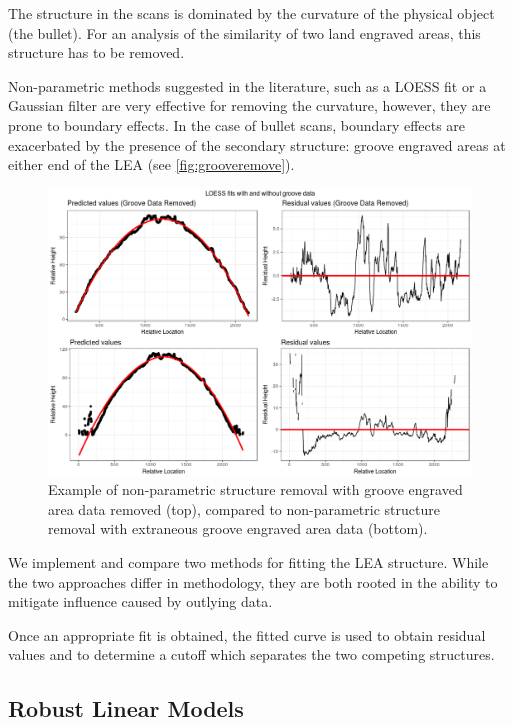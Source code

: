 \documentclass[]{article}
\begin{document}
The structure in the scans is dominated by the curvature of the physical
object (the bullet). For an analysis of the similarity of two land
engraved areas, this structure has to be removed.

Non-parametric methods suggested in the literature, such as a LOESS fit
\citep{Hare1} or a Gaussian filter \citep{Chu1} are very effective for
removing the curvature, however, they are prone to boundary effects. In
the case of bullet scans, boundary effects are exacerbated by the
presence of the secondary structure: groove engraved areas at either end
of the LEA (see \autoref{fig:grooveremove}).

{\color{orange}{ describe the figure in words, in particular the boundary effect }}

\begin{figure}
\includegraphics[width=1\linewidth]{images/groove_vs_nogroove} \caption{Example of non-parametric structure removal with groove engraved area data removed (top), compared to non-parametric structure removal with extraneous groove engraved area data (bottom).}\label{fig:grooveremove}
\end{figure}

We implement and compare two methods for fitting the LEA structure.
While the two approaches differ in methodology, they are both rooted in
the ability to mitigate influence caused by outlying data.

Once an appropriate fit is obtained, the fitted curve is used to obtain
residual values and to determine a cutoff which separates the two
competing structures.

\subsection{Robust Linear Models}
\end{document}
